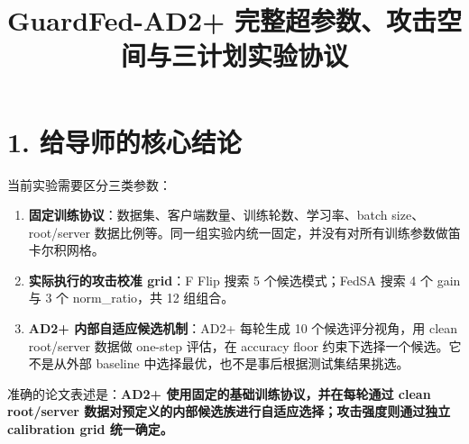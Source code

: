 \documentclass[UTF8,a4paper,10pt]{ctexart}
\begin{document}
\title{GuardFed-AD2+ 完整超参数、攻击空间与三计划实验协议}
\maketitle
\section{1. 给导师的核心结论}
当前实验需要区分三类参数：

\begin{enumerate}
\item \textbf{固定训练协议}：数据集、客户端数量、训练轮数、学习率、batch size、root/server 数据比例等。同一组实验内统一固定，并没有对所有训练参数做笛卡尔积网格。
\item \textbf{实际执行的攻击校准 grid}：F Flip 搜索 5 个候选模式；FedSA 搜索 4 个 gain 与 3 个 norm\_ratio，共 12 组组合。
\item \textbf{AD2+ 内部自适应候选机制}：AD2+ 每轮生成 10 个候选评分视角，用 clean root/server 数据做 one-step 评估，在 accuracy floor 约束下选择一个候选。它不是从外部 baseline 中选择最优，也不是事后根据测试集结果挑选。
\end{enumerate}
准确的论文表述是：\textbf{AD2+ 使用固定的基础训练协议，并在每轮通过 clean root/server 数据对预定义的内部候选族进行自适应选择；攻击强度则通过独立 calibration grid 统一确定。}
\end{document}
